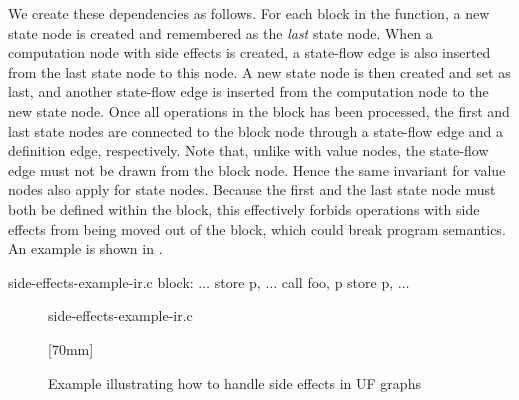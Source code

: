 We create these dependencies as follows.
%
For each \gls{block} in the \gls{function}, a new \gls{state node} is created
and remembered as the \emph{last} \gls{state node}.
%
When a \gls{computation node} with side effects is created, a \gls{state-flow
  edge} is also inserted from the last \gls{state node} to this \gls{node}.
%
A new \gls{state node} is then created and set as last, and another
\gls{state-flow edge} is inserted from the \gls{computation node} to the new
\gls{state node}.
%
Once all \glspl{operation} in the \gls{block} has been processed, the first and
last \glspl{state node} are connected to the \gls{block node} through a
\gls{state-flow edge} and a \gls{definition edge}, respectively.
%
Note that, unlike with \glspl{value node}, the \gls{state-flow edge} must not be
drawn from the  \gls{block node}.
%
Hence the same invariant for \glspl{value node} also apply for \glspl{state
  node}.
%
Because the first and the last \gls{state node} must both be defined within the
\gls{block}, this effectively forbids \glspl{operation} with side effects from
being moved out of the \gls{block}, which could break \gls{program} semantics.
%
An example is shown in .
%
\begin{filecontents*}{side-effects-example-ir.c}
block:
  $\ldots$
  store p, $\ldots$
  call foo, p
  store p, $\ldots$
\end{filecontents*}
%
\begin{figure}
  \centering%
  \mbox{}%
  \hfill%
                {%
                  \begin{lstpage}{26mm}
                                    {side-effects-example-ir.c}%
                  \end{lstpage}%
                }%
  \hfill%
                [70mm]%
                {%
                }%
  \hfill%
  \mbox{}

  \caption{Example illustrating how to handle side effects in UF graphs}%
\end{figure}


